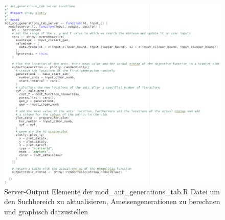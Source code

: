 \begin{figure}[H]
 \centering
 \includegraphics[scale=0.7]{"images/04_Visualisierung_des_Algorithmus/antGenerations_plotGens.png"}
 \caption{Server-Output Elemente der mod\_ant\_generations\_tab.R Datei um den Suchbereich zu aktualisieren, Ameisengenerationen zu berechnen und graphisch darzustellen}
 \label{fig:antGenerations_plotGens}
\end{figure}